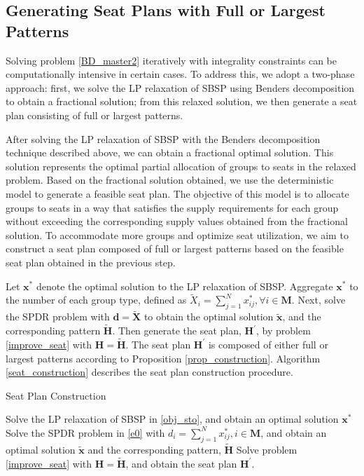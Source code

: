\subsection{Generating Seat Plans with Full or Largest Patterns}\label{seat_assignment}
Solving problem \eqref{BD_master2} iteratively with integrality constraints can be computationally intensive in certain cases. To address this, we adopt a two-phase approach: first, we solve the LP relaxation of SBSP using Benders decomposition to obtain a fractional solution; from this relaxed solution, we then generate a seat plan consisting of full or largest patterns.

After solving the LP relaxation of SBSP with the Benders decomposition technique described above, we can obtain a fractional optimal solution. This solution represents the optimal partial allocation of groups to seats in the relaxed problem. Based on the fractional solution obtained, we use the deterministic model to generate a feasible seat plan. The objective of this model is to allocate groups to seats in a way that satisfies the supply requirements for each group without exceeding the corresponding supply values obtained from the fractional solution. To accommodate more groups and optimize seat utilization, we aim to construct a seat plan composed of full or largest patterns based on the feasible seat plan obtained in the previous step.


Let $\mathbf{x}^{*}$ denote the optimal solution to the LP relaxation of SBSP. Aggregate $\mathbf{x}^{*}$ to the number of each group type, defined as $\tilde{X}_{i} =\sum_{j=1}^{N} x^{*}_{ij}, \forall i \in \mathbf{M}$. Next, solve the SPDR problem with $\bm{d} = \bm{\tilde{X}}$ to obtain the optimal solution $\mathbf{\tilde{x}}$, and the corresponding pattern $\tilde{\bm{H}}$. Then generate the seat plan, $\bm{H}^{\prime}$, by problem \eqref{improve_seat} with $\bm{H}=  \tilde{\bm{H}}$. The seat plan $\bm{H}^{\prime}$ is composed of either full or largest patterns according to Proposition \ref{prop_construction}. Algorithm \ref{seat_construction} describes the seat plan construction procedure.


\begin{algorithm}
  \caption{Seat Plan Construction}\label{seat_construction}
    {Solve the LP relaxation of SBSP in \eqref{obj_sto}, and obtain an optimal solution $\mathbf{x}^{*}$\;}
    {Solve the SPDR problem in \eqref{e0} with $d_{i} = \sum_{j=1}^{N} x^{*}_{ij}, i \in \mathbf{M}$, and obtain an optimal solution $\tilde{\mathbf{x}}$ and the corresponding pattern, $\tilde{\bm{H}}$\;}
    {Solve problem \eqref{improve_seat} with $\bm{H} = \tilde{\bm{H}}$, and obtain the seat plan $\bm{H}^{\prime}$.}
\end{algorithm}

